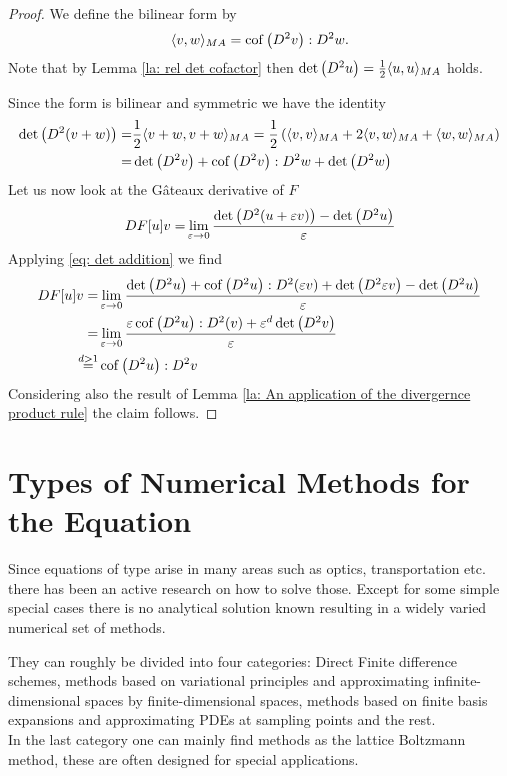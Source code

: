 	\begin{proof}
	We define the \MA bilinear form by
	\[
	 \langle v, w \rangle_{MA} = \operatorname{cof} \left( D^2 v \right):D^2w.
	\]
	Note that by Lemma \ref{la: rel det cofactor} then $\det{\left(D^2 u\right)} = \frac 1 2  \langle u, u \rangle_{MA}$ holds.
	
	Since the \MA form is bilinear and symmetric we have the identity
	\begin{align}
		\det{\left(D^2 (v+w)\right)} =& \frac 1 2  \langle v+w, v+w \rangle_{MA} = \frac 1 2 \left( \langle v, v \rangle_{MA} + 2  \langle v, w \rangle_{MA} +  \langle w, w \rangle_{MA} \right) \nonumber\\
		=&  \det{\left(D^2 v\right)}  + \operatorname{cof} \left( D^2 v \right) : D^2 w + \det{\left(D^2 w\right)} \label{eq: det addition}
	\end{align}
	 Let us now look at the G\^ateaux derivative of $F$
		\begin{align*}
			DF[u]v =& \lim\limits_{\varepsilon \rightarrow 0} \frac { \det{\left(D^2(u+\varepsilon v)\right)} - \det{\left(D^2u\right)}}\varepsilon\\
			\end{align*}
Applying \eqref{eq: det addition} we find
		\begin{align*}
			DF[u]v =& \lim\limits_{\varepsilon \rightarrow 0} 
										\frac  {\det{\left(D^2 u\right)} + \operatorname{cof} \left( D^2 u \right) : D^2(\varepsilon v) + \det{\left(D^2 \varepsilon v\right)} - \det{\left(D^2 u\right)}}
													\varepsilon\\ 
			 =& \lim\limits_{\varepsilon \rightarrow 0} 
										\frac  {\varepsilon \operatorname{cof} \left( D^2 u \right) : D^2(v) + \varepsilon^d \det{\left(D^2 v\right)}}
													\varepsilon\\ 
			\stackrel{d > 1} =& \operatorname{cof} \left( D^2 u \right):D^2v
		\end{align*}
Considering also the result of Lemma \ref{la: An application of the divergernce product rule} the claim follows.
	\end{proof}	


\section{Types of Numerical Methods for the \MA Equation}
Since equations of \MA type arise in many areas such as optics, transportation etc. there has been an active research on how to solve those. Except for some simple special cases there is no analytical solution known resulting in a widely varied numerical set of methods.

They can roughly be divided into four categories: Direct Finite difference schemes, methods based on variational principles and approximating infinite-dimensional spaces by finite-dimensional spaces, methods based on finite basis expansions and approximating PDEs at sampling points and the rest. \\
In the last category one can mainly find methods as the lattice Boltzmann method, these are often designed for special applications.

